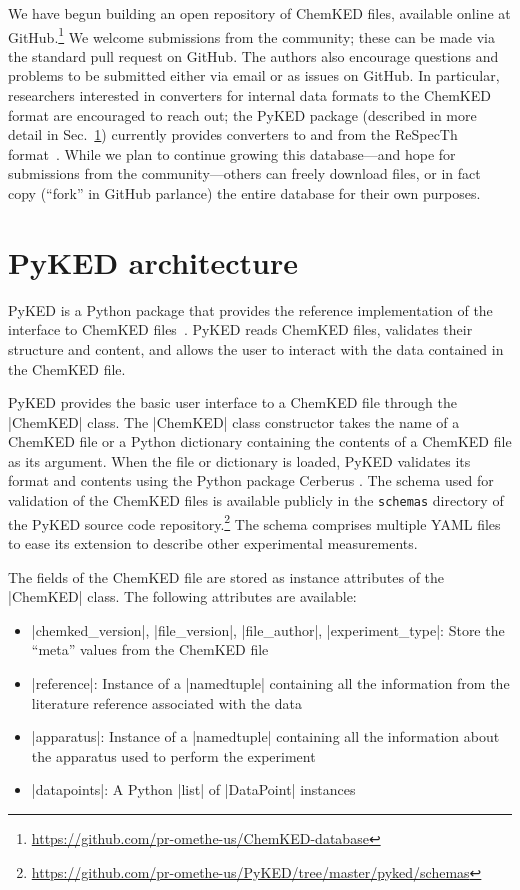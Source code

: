 \documentclass[12pt]{ijck}
\newcommand\ck{ChemKED}
\newcommand\pk{PyKED}
\begin{document}
We have begun building an open repository of \ck{} files, available online at
GitHub.\footnote{\url{https://github.com/pr-omethe-us/ChemKED-database}}
We welcome submissions from the community; these can be made via the standard pull request
on GitHub. The authors also encourage questions and problems to be submitted either via
email or as issues on GitHub. In particular, researchers interested in converters for
internal data formats to the \ck{} format are encouraged to reach out;
the \pk{} package (described in more detail in Sec.~\ref{sec:pyked-architecture})
currently provides converters to and from the ReSpecTh format~\autocite{Varga2017}.
While we plan to continue growing this database---and hope for submissions from
the community---others can freely download files, or in fact copy (``fork'' in GitHub
parlance) the entire database for their own purposes.

\section{PyKED architecture}\label{sec:pyked-architecture}
%
\pk{} is a Python package that provides the reference implementation
of the interface to \ck{} files~\autocite{PyKED}. \pk{} reads \ck{} files, validates
their structure and content, and allows the user to interact with the data contained
in the \ck{} file.

\pk{} provides the basic user interface to a \ck{} file through the
\pybox|ChemKED| class. The \pybox|ChemKED| class constructor takes the name
of a \ck{} file or a Python dictionary containing the contents of a \ck{} file
as its argument. When the file or dictionary is loaded, \pk{} validates its
format and contents using the Python package Cerberus \autocite{cerberus}. The
schema used for validation of the \ck{} files is available publicly in the
\texttt{schemas} directory of the PyKED source code
repository.\footnote{\url{https://github.com/pr-omethe-us/PyKED/tree/master/pyked/schemas}}
The schema comprises multiple YAML files to ease its extension to describe other
experimental measurements.

The fields of the \ck{} file are stored as instance attributes of the
\pybox|ChemKED| class. The following attributes are available:
%
\begin{itemize}
    \item \pybox|chemked_version|, \pybox|file_version|, \pybox|file_author|,
    \pybox|experiment_type|: Store the ``meta'' values from the \ck{} file
    \item \pybox|reference|: Instance of a \pybox|namedtuple| containing all
    the information from the literature reference associated with the data
    \item \pybox|apparatus|: Instance of a \pybox|namedtuple| containing all
    the information about the apparatus used to perform the experiment
    \item \pybox|datapoints|: A Python \pybox|list| of \pybox|DataPoint| instances
\end{itemize}
\end{document}
